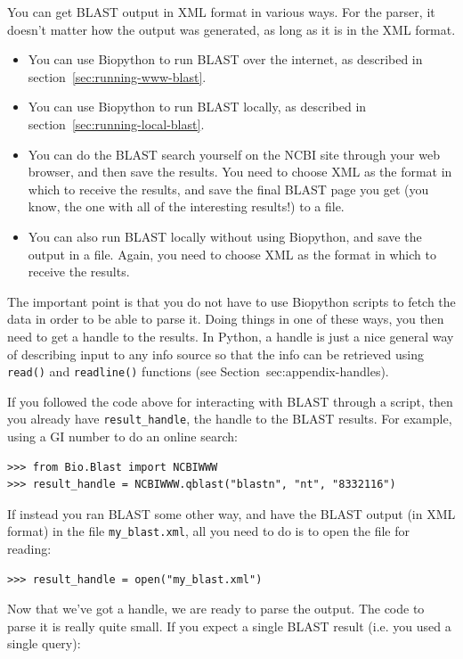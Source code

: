 \documentclass{report}
\begin{document}
You can get BLAST output in XML format in various ways. For the parser, it
doesn't matter how the output was generated, as long as it is in the XML format.
\begin{itemize}
\item You can use Biopython to run BLAST over the internet, as described in
section~\ref{sec:running-www-blast}.
\item You can use Biopython to run BLAST locally, as described in
section~\ref{sec:running-local-blast}.
\item You can do the BLAST search yourself on the NCBI site through your
web browser, and then save the results. You need to choose XML as the format
in which to receive the results, and save the final BLAST page you get
(you know, the one with all of the interesting results!) to a file.
\item You can also run BLAST locally without using Biopython, and save
the output in a file. Again, you need to choose XML as the format in which
to receive the results.
\end{itemize}
The important point is that you do not have to use Biopython
scripts to fetch the data in order to be able to parse it.
Doing things in one of these ways, you then need to get a handle
to the results. In Python, a handle is just a nice general way of
describing input to any info source so that the info can be retrieved
using \verb|read()| and \verb|readline()| functions
(see Section~{sec:appendix-handles}).

If you followed the code above for interacting with BLAST through a
script, then you already have \verb|result_handle|, the handle to the
BLAST results.  For example, using a GI number to do an online search:

\begin{verbatim}
>>> from Bio.Blast import NCBIWWW
>>> result_handle = NCBIWWW.qblast("blastn", "nt", "8332116")
\end{verbatim}

If instead you ran BLAST some other way, and have the
BLAST output (in XML format) in the file \verb|my_blast.xml|, all you
need to do is to open the file for reading:

\begin{verbatim}
>>> result_handle = open("my_blast.xml")
\end{verbatim}

Now that we've got a handle, we are ready to parse the output. The
code to parse it is really quite small.  If you expect a single
BLAST result (i.e. you used a single query):
\end{document}
